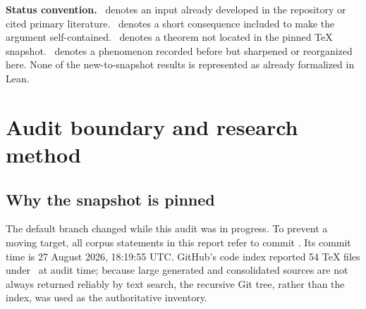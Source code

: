 \documentclass[11pt]{article}
\numberwithin{equation}{section}
\theoremstyle{definition}
\theoremstyle{remark}
\begin{document}
\begin{abstract}
Claims marked \NewResult\ mean only that no counterpart was found in the frozen
TeX corpus after targeted collision searches.  They are proved here, but no claim
of worldwide historical priority is made.  In particular, Rvachev's 1977 paper
on approximation by $\RvachevUp$ and the broader Russian-language atomic-function
literature require a separate priority audit.
\end{abstract}

\begin{boxedremark}
\textbf{Status convention.}
\Corpus\ denotes an input already developed in the repository or cited primary
literature.  \Derived\ denotes a short consequence included to make the argument
self-contained.  \NewResult\ denotes a theorem not located in the pinned TeX
snapshot.  \Observed\ denotes a phenomenon recorded before but sharpened or
reorganized here.  None of the new-to-snapshot results is represented as already
formalized in Lean.
\end{boxedremark}


\newpage

\section{Audit boundary and research method}
\label{p2:sec:audit}

\subsection{Why the snapshot is pinned}

The default branch changed while this audit was in progress.  To prevent a moving
target, all corpus statements in this report refer to commit \commit.  Its commit
time is 27 August 2026, 18:19:55 UTC.  GitHub's code index reported 54 TeX files
under \repo\ at audit time; because large generated and consolidated sources are
not always returned reliably by text search, the recursive Git tree, rather than
the index, was used as the authoritative inventory.
\end{document}
